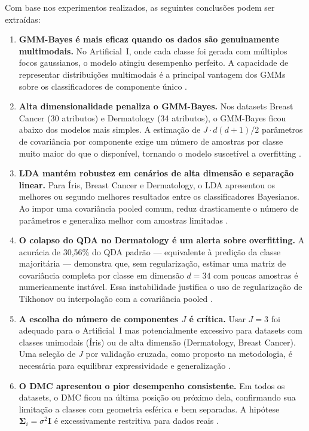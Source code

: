 Com base nos experimentos realizados, as seguintes conclusões podem ser extraídas:

\begin{enumerate}

  \item \textbf{GMM-Bayes é mais eficaz quando os dados são genuinamente multimodais.}
  No Artificial~I, onde cada classe foi gerada com múltiplos focos gaussianos, o modelo
  atingiu desempenho perfeito. A capacidade de representar distribuições multimodais
  é a principal vantagem dos GMMs sobre os classificadores de componente único
  \cite{bishop2006,theodoridis2009}.

  \item \textbf{Alta dimensionalidade penaliza o GMM-Bayes.}
  Nos datasets Breast Cancer (30 atributos) e Dermatology (34 atributos), o GMM-Bayes
  ficou abaixo dos modelos mais simples. A estimação de $J \cdot d(d+1)/2$ parâmetros de
  covariância por componente exige um número de amostras por classe muito maior do que o
  disponível, tornando o modelo suscetível a overfitting \cite{duda2001}.

  \item \textbf{LDA mantém robustez em cenários de alta dimensão e separação linear.}
  Para Íris, Breast Cancer e Dermatology, o LDA apresentou os melhores ou segundo melhores
  resultados entre os classificadores Bayesianos. Ao impor uma covariância pooled comum,
  reduz drasticamente o número de parâmetros e generaliza melhor com amostras limitadas
  \cite{duda2001,bishop2006}.

  \item \textbf{O colapso do QDA no Dermatology é um alerta sobre overfitting.}
  A acurácia de 30,56\% do QDA padrão — equivalente à predição da classe majoritária —
  demonstra que, sem regularização, estimar uma matriz de covariância completa por classe
  em dimensão $d=34$ com poucas amostras é numericamente instável. Essa instabilidade
  justifica o uso de regularização de Tikhonov ou interpolação com a covariância pooled
  \cite{bishop2006}.

  \item \textbf{A escolha do número de componentes $J$ é crítica.}
  Usar $J=3$ foi adequado para o Artificial~I mas potencialmente excessivo para datasets
  com classes unimodais (Íris) ou de alta dimensão (Dermatology, Breast Cancer). Uma
  seleção de $J$ por validação cruzada, como proposto na metodologia, é necessária para
  equilibrar expressividade e generalização \cite{theodoridis2009}.

  \item \textbf{O DMC apresentou o pior desempenho consistente.}
  Em todos os datasets, o DMC ficou na última posição ou próximo dela, confirmando sua
  limitação a classes com geometria esférica e bem separadas. A hipótese
  $\boldsymbol{\Sigma}_i = \sigma^2 \mathbf{I}$ é excessivamente restritiva para dados
  reais \cite{duda2001}.

\end{enumerate}

